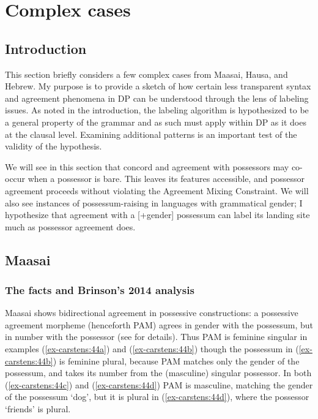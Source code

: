 \documentclass[output=paper
,modfonts
,nonflat]{langsci/langscibook}
\begin{document}
\section{Complex cases} \label{sec-carstens:6}
\subsection{Introduction} \label{sec-carstens:6.1}

This section briefly considers a few complex cases from Maasai, Hausa, and Hebrew. My purpose is to provide a sketch of how certain less transparent syntax and agreement phenomena in DP can be understood through the lens of labeling issues. As noted in the introduction, the labeling algorithm is hypothesized to be a general property of the grammar and as such must apply within DP as it does at the clausal level. Examining additional patterns is an important test of the validity of the hypothesis.

We will see in this section that concord and agreement with possessors may co-occur when a possessor is bare. This leaves its features accessible, and possessor agreement proceeds without violating the Agreement Mixing Constraint. We will also see instances of possessum-raising in languages with grammatical gender; I hypothesize that agreement with a [+gender] possessum can label its landing site much as possessor agreement does.

\subsection{Maasai} \label{sec-carstens:6.2}
\subsubsection{The facts and Brinson's 2014 analysis} \label{sec-carstens:6.2.1}
Maasai shows bidirectional agreement in possessive constructions: a possessive agreement morpheme (henceforth PAM) agrees in gender with the possessum, but in number with the possessor (see \citealt{Storto2003,Brinson2014} for details). Thus PAM is feminine singular in examples (\ref{ex-carstens:44a}) and (\ref{ex-carstens:44b}) though the possessum in (\ref{ex-carstens:44b}) is feminine plural, because PAM matches only the gender of the possessum, and takes its number from the (masculine) singular possessor. In both (\ref{ex-carstens:44c}) and (\ref{ex-carstens:44d}) PAM  is masculine, matching the gender of the possessum `dog', but it is plural in (\ref{ex-carstens:44d}), where the possessor `friends' is plural.
\end{document}
